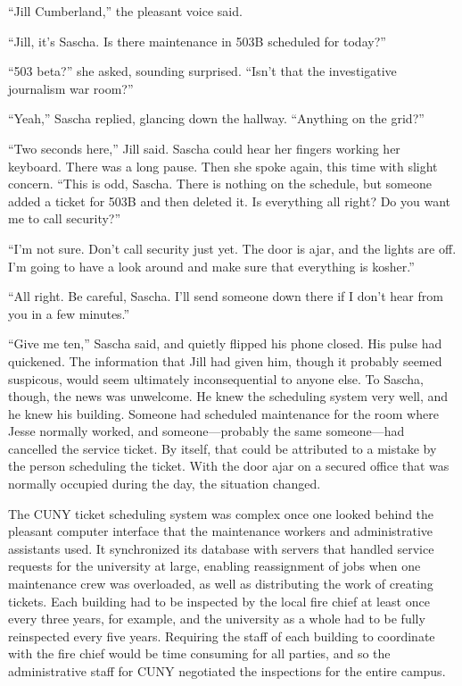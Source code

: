 \documentclass[12pt]{book}
\begin{document}
``Jill Cumberland,'' the pleasant voice said.

``Jill, it's Sascha.  Is there maintenance in 503B scheduled for today?''

``503 beta?'' she asked, sounding surprised.  ``Isn't that the investigative journalism war room?''

``Yeah,'' Sascha replied, glancing down the hallway.  ``Anything on the grid?''

``Two seconds here,'' Jill said.  Sascha could hear her fingers working her keyboard.  There was a long pause.  Then she spoke again, this time with slight concern.  ``This is odd, Sascha.  There is nothing on the schedule, but someone added a ticket for 503B and then deleted it.  Is everything all right?  Do you want me to call security?''

``I'm not sure.  Don't call security just yet.  The door is ajar, and the lights are off.  I'm going to have a look around and make sure that everything is kosher.''

``All right.  Be careful, Sascha.  I'll send someone down there if I don't hear from you in a few minutes.''

``Give me ten,'' Sascha said, and quietly flipped his phone closed.  His pulse had quickened.  The information that Jill had given him, though it probably seemed suspicous, would seem ultimately inconsequential to anyone else.  To Sascha, though, the news was unwelcome.  He knew the scheduling system very well, and he knew his building.  Someone had scheduled maintenance for the room where Jesse normally worked, and someone---probably the same someone---had cancelled the service ticket.  By itself, that could be attributed to a mistake by the person scheduling the ticket.  With the door ajar on a secured office that was normally occupied during the day, the situation changed.


The CUNY ticket scheduling system was complex once one looked behind the pleasant computer interface that the maintenance workers and administrative assistants used.  It synchronized its database with servers that handled service requests for the university at large, enabling reassignment of jobs when one maintenance crew was overloaded, as well as distributing the work of creating tickets.  Each building had to be inspected by the local fire chief at least once every three years, for example, and the university as a whole had to be fully reinspected every five years.  Requiring the staff of each building to coordinate with the fire chief would be time consuming for all parties, and so the administrative staff for CUNY negotiated the inspections for the entire campus.
\end{document}
